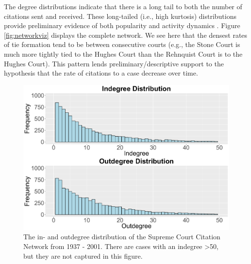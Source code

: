 \documentclass[headsepline=true, abstracton]{scrartcl}
\begin{document}
The degree distributions indicate that there is a long tail to both the number of citations sent and received. These long-tailed (i.e., high kurtosis) distributions provide preliminary evidence of both popularity and activity dynamics \citep{strogatz2001exploring}. Figure \ref{fig:networkviz} displays the complete network. We see here that the densest rates of tie formation tend to be between consecutive courts (e.g., the Stone Court is much more tightly tied to the Hughes Court than the Rehnquist Court is to the Hughes Court). This pattern lends preliminary/descriptive support to the hypothesis that the rate of citations to a case decrease over time.


\begin{figure}[htp]
\includegraphics[scale=0.5]{degree_distribution}
\caption{The in- and outdegree distribution of the Supreme Court Citation Network from 1937 - 2001. There are cases with an indegree >50, but they are not captured in this figure.}
 \label{degree_dist}
\vspace{-.25cm}
\end{figure}
\end{document}
